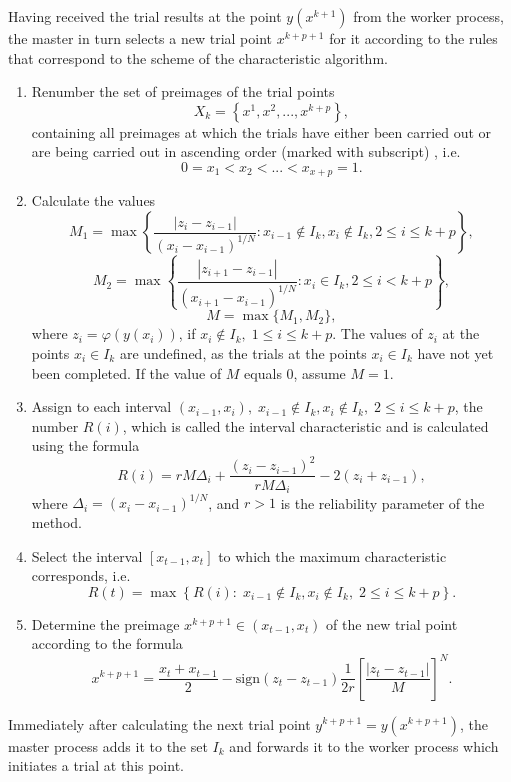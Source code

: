 \documentclass{svproc}
\begin{document}
Having received the trial results at the point $y(x^{k+1})$ from the worker process, the master in turn selects a new trial point $x^{k+p+1}$ for it according to the rules that correspond to the scheme of the characteristic algorithm.

\begin{enumerate}
	\item 
Renumber the set of preimages of the trial points 
\[
X_k = \left\{x^1, x^2,...,x^{k+p} \right\},
\]
containing all preimages at which the trials have either been carried out or are being carried out in ascending order (marked with subscript) , i.e.
\[
0=x_1<x_2<...<x_{x+p}=1.
\]
	\item
Calculate the values
\[
M_1=\max \left\{ \frac{ \left|z_i - z_{i-1} \right|}{(x_i-x_{i-1})^{1/N}} : x_{i-1} \notin I_k, x_i \notin I_k, 2\leq i\leq k+p \right\},
\]
\[
M_2=\max \left\{ \frac{ \left|z_{i+1} - z_{i-1} \right|}{(x_{i+1}-x_{i-1})^{1/N}} : x_i \in I_k, 2\leq i < k+p \right\},
\]
\[
M=\max\{M_1,M_2\},
\]
where $z_i=\varphi(y(x_i))$, if $x_i \notin I_k, \; 1\leq i \leq k+p$. The values of $z_i$ at the points $x_i \in I_k$ are undefined, as the trials at the points $x_i \in I_k$ have not yet been completed. If the value of $M$ equals 0, assume $M=1$.

	\item
Assign to each interval $(x_{i-1},x_i), \; x_{i-1} \notin I_k, x_i \notin I_k, \; 2\leq i\leq k+p$, the number $R(i)$, which is called the interval characteristic and is calculated using the formula
\[
R(i)=rM\Delta_i+\frac{(z_i-z_{i-1})^2}{rM\Delta_i}-2(z_i+z_{i-1}),
\]
where $\Delta_i=\left(x_i-x_{i-1}\right)^{1/N}$, and $r>1$ is the reliability parameter of the method.

	\item
Select the interval $[x_{t-1},x_t]$ to which the maximum characteristic corresponds, i.e.
\[
R(t) = \max \left\{ R(i): \; x_{i-1} \notin I_k, x_i \notin I_k, \; 2\leq i\leq k+p \right\}.
\]
	\item
Determine the preimage $x^{k+p+1} \in (x_{t-1},x_t)$ of the new trial point according to the formula
\[
x^{k+p+1} = \frac{x_{t}+x_{t-1}}{2} - \mathrm{sign}(z_{t}-z_{t-1})\frac{1}{2r}\left[\frac{\left|z_{t}-z_{t-1}\right|}{M}\right]^N.
\]
\end{enumerate}

Immediately after calculating the next trial point $y^{k+p+1} = y(x^{k+p+1})$, the master process adds it to the set $I_k$ and forwards it to the worker process which initiates a trial at this point.
\end{document}
